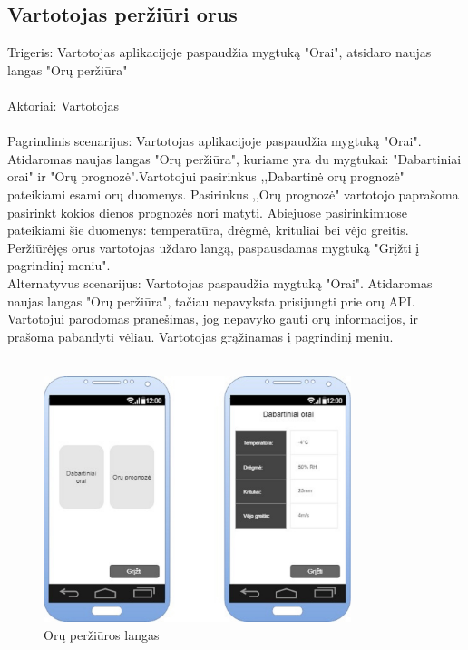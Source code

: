 \documentclass[oneside]{VUMIFPSkursinis}
\begin{document}
\subsection{Vartotojas peržiūri orus}
	Trigeris: Vartotojas aplikacijoje paspaudžia mygtuką "Orai", atsidaro naujas langas "Orų peržiūra" \\ \\
	Aktoriai: Vartotojas \\ \\
Pagrindinis scenarijus: Vartotojas aplikacijoje paspaudžia mygtuką "Orai". Atidaromas naujas langas "Orų peržiūra", kuriame yra du mygtukai: "Dabartiniai orai" ir "Orų prognozė".Vartotojui pasirinkus ,,Dabartinė orų prognozė" pateikiami esami orų duomenys. Pasirinkus ,,Orų prognozė" vartotojo paprašoma pasirinkt kokios dienos prognozės nori matyti. Abiejuose pasirinkimuose pateikiami šie duomenys: temperatūra, drėgmė, krituliai bei vėjo greitis. Peržiūrėjęs orus vartotojas uždaro langą, paspausdamas mygtuką "Grįžti į pagrindinį meniu". \\
	Alternatyvus scenarijus: Vartotojas paspaudžia mygtuką "Orai". Atidaromas naujas langas "Orų peržiūra", tačiau nepavyksta prisijungti prie orų API. Vartotojui parodomas pranešimas, jog nepavyko gauti orų informacijos, ir prašoma pabandyti vėliau. Vartotojas grąžinamas į pagrindinį meniu. \\ \\


\begin{figure}[h]
    \centering
    \includegraphics[width=0.80\textwidth]{GUI11.jpg}
    \caption{Orų peržiūros langas}
    \label{fig:orai}
\end{figure}
\end{document}
